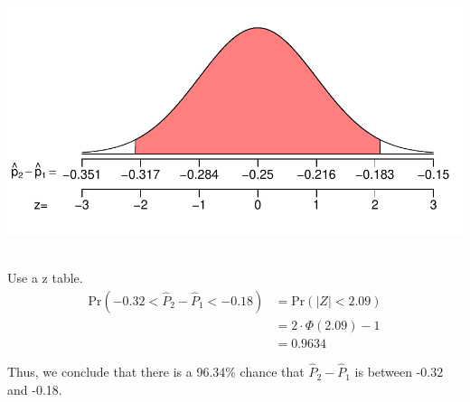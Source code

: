 \begin{solution}
\includegraphics{diff_sampling_central_area-1.pdf} ~

Use a z table. \[
\begin{aligned}
\text{Pr}\left(-0.32 < \hat{P}_2 - \hat{P}_1 < -0.18\right) &= \text{Pr}(|Z|<2.09) \\
&= 2\cdot\Phi(2.09)-1 \\
&= 0.9634
\end{aligned}
\]

Thus, we conclude that there is a 96.34\% chance that
\(\hat{P}_2-\hat{P}_1\) is between -0.32 and -0.18.
\end{solution}

